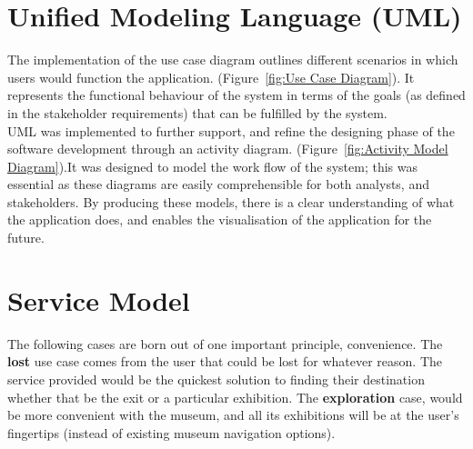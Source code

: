 

\section{Unified Modeling Language (UML)}

The implementation of the use case diagram outlines different scenarios in which users would function the application. (Figure~\ref{fig:Use Case Diagram}). It represents the functional behaviour of the system in terms of the goals (as defined in the stakeholder requirements) that can be fulfilled by the system.\\

UML was implemented to further support, and refine the designing phase of the software development through an activity diagram. (Figure~\ref{fig:Activity Model Diagram}).It was designed to model the work flow of the system; this was essential as these diagrams are easily comprehensible for both analysts, and stakeholders. By producing these models, there is a clear understanding of what the application does, and enables the visualisation of the application for the future.\\

\section{Service Model}
The following cases are born out of one important principle, convenience. The \textbf{lost} use case comes from the user that could be lost for whatever reason. The service provided would be the quickest solution to finding their destination whether that be the exit or a particular exhibition. The \textbf{exploration} case, would be more convenient with the museum, and all its exhibitions will be at the user's fingertips (instead of existing museum navigation options).

